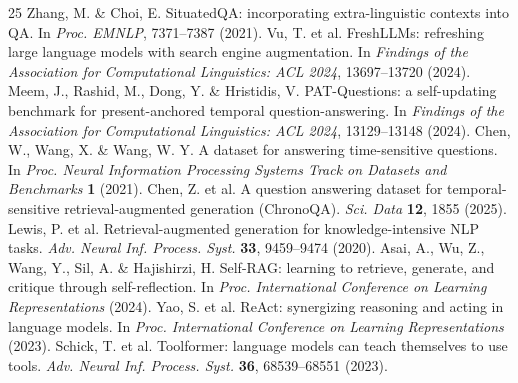 \begin{thebibliography}{25}
 Zhang, M. \& Choi, E. SituatedQA: incorporating extra-linguistic contexts into QA. In \emph{Proc. EMNLP}, 7371--7387 (2021).
 Vu, T. et al. FreshLLMs: refreshing large language models with search engine augmentation. In \emph{Findings of the Association for Computational Linguistics: ACL 2024}, 13697--13720 (2024).
 Meem, J., Rashid, M., Dong, Y. \& Hristidis, V. PAT-Questions: a self-updating benchmark for present-anchored temporal question-answering. In \emph{Findings of the Association for Computational Linguistics: ACL 2024}, 13129--13148 (2024).
 Chen, W., Wang, X. \& Wang, W. Y. A dataset for answering time-sensitive questions. In \emph{Proc. Neural Information Processing Systems Track on Datasets and Benchmarks} \textbf{1} (2021).
 Chen, Z. et al. A question answering dataset for temporal-sensitive retrieval-augmented generation (ChronoQA). \emph{Sci. Data} \textbf{12}, 1855 (2025).
 Lewis, P. et al. Retrieval-augmented generation for knowledge-intensive NLP tasks. \emph{Adv. Neural Inf. Process. Syst.} \textbf{33}, 9459--9474 (2020).
 Asai, A., Wu, Z., Wang, Y., Sil, A. \& Hajishirzi, H. Self-RAG: learning to retrieve, generate, and critique through self-reflection. In \emph{Proc. International Conference on Learning Representations} (2024).
 Yao, S. et al. ReAct: synergizing reasoning and acting in language models. In \emph{Proc. International Conference on Learning Representations} (2023).
 Schick, T. et al. Toolformer: language models can teach themselves to use tools. \emph{Adv. Neural Inf. Process. Syst.} \textbf{36}, 68539--68551 (2023).

\end{thebibliography}
